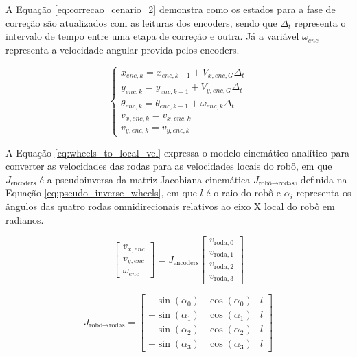 \documentclass[acronym, symbols, table, deposito]{fei}
\begin{document}
			A Equação \eqref{eq:correcao_cenario_2} demonstra como os estados para a fase de correção são atualizados com as leituras dos encoders, sendo que $\Delta_t$ representa o intervalo de tempo entre uma etapa de correção e outra. Já a variável $\omega_{enc}$ representa a velocidade angular provida pelos encoders.
			
			\begin{equation}\label{eq:correcao_cenario_2}
				\begin{cases}
					x_{enc,k} = x_{enc,k-1} + V_{x,enc,G} \Delta_t \\
					y_{enc,k} = y_{enc,k-1} + V_{y,enc,G} \Delta_t  \\
					\theta_{enc,k} = \theta_{enc,k-1} + \omega_{enc,k} \Delta_t \\
					v_{x,enc,k} = v_{x,enc,k}\\
					v_{y,enc,k} = v_{y,enc,k}
				\end{cases}
			\end{equation}
		
			A Equação \eqref{eq:wheels_to_local_vel} expressa o modelo cinemático analítico para converter as velocidades das rodas para as velocidades locais do robô, em que $J_{\text{encoders}}$ é a pseudoinversa da matriz Jacobiana cinemática $J_{\text{robô} \to \text{rodas}}$, definida na Equação \eqref{eq:pseudo_inverse_wheels}, em que $l$ é o raio do robô e $\alpha_i$ representa os ângulos das quatro rodas omnidirecionais relativos ao eixo X local do robô em radianos.
		
			\begin{equation}\label{eq:wheels_to_local_vel}
				\begin{bmatrix}
					v_{x,enc} \\
					v_{y,enc} \\
					\omega_{enc}
				\end{bmatrix}
				= J_{\text{encoders}}
				\begin{bmatrix}
					v_{\text{roda},0} \\
					v_{\text{roda},1} \\
					v_{\text{roda},2} \\
					v_{\text{roda},3}
				\end{bmatrix}
			\end{equation}
			
			\begin{equation}\label{eq:pseudo_inverse_wheels}
				J_{\text{robô} \to \text{rodas}} =
				\begin{bmatrix}
					-\sin(\alpha_0) & \cos(\alpha_0) & l \\
					-\sin(\alpha_1) & \cos(\alpha_1) & l \\
					-\sin(\alpha_2) & \cos(\alpha_2) & l \\
					-\sin(\alpha_3) & \cos(\alpha_3) & l
				\end{bmatrix} 
			\end{equation}
			
\end{document}
